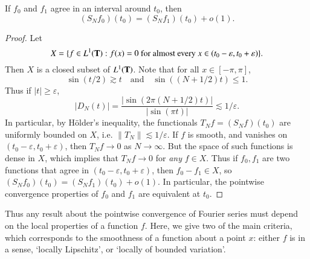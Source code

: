 \begin{lemma}
    If $f_0$ and $f_1$ agree in an interval around $t_0$, then
    \[ (S_N f_0)(t_0) = (S_N f_1)(t_0) + o(1). \]
\end{lemma}
\begin{proof}
    Let
    \[ X = \{ f \in L^1(\operatorname{\mathbf{T}}) : f(x) = 0\ \text{for almost every $x \in (t_0 - \varepsilon, t_0 + \varepsilon$)} \}. \]
    Then $X$ is a closed subset of $L^1(\operatorname{\mathbf{T}})$. Note that for all $x \in [-\pi,\pi]$,
    \[ \sin(t/2) \gtrsim t \quad\text{and}\quad \sin((N+1/2)t) \leq 1. \]
    Thus if $|t| \geq \varepsilon$,
    \[ |D_N(t)| = \frac{|\sin(2 \pi (N+1/2)t)|}{|\sin(\pi t)|} \lesssim 1/\varepsilon. \]
    In particular, by H\"{o}lder's inequality, the functionals $T_Nf = (S_N f)(t_0)$ are uniformly bounded on $X$, i.e. $\| T_N \| \lesssim 1/\varepsilon$. If $f$ is smooth, and vanishes on $(t_0 - \varepsilon, t_0 + \varepsilon)$, then $T_N f \to 0$ as $N \to \infty$. But the space of such functions is dense in $X$, which implies that $T_N f \to 0$ for \emph{any} $f \in X$. Thus if $f_0, f_1$ are two functions that agree in $(t_0 - \varepsilon, t_0 + \varepsilon)$, then $f_0 - f_1 \in X$, so $(S_N f_0)(t_0) = (S_N f_1)(t_0) + o(1)$. In particular, the pointwise convergence properties of $f_0$ and $f_1$ are equivalent at $t_0$.
\end{proof}

Thus any result about the pointwise convergence of Fourier series must depend on the local properties of a function $f$. Here, we give two of the main criteria, which corresponds to the smoothness of a function about a point $x$: either $f$ is in a sense, `locally Lipschitz', or `locally of bounded variation'.

